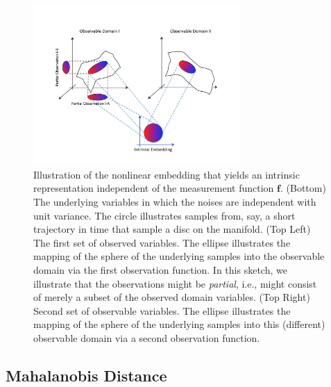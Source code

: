 \documentclass[aip,jcp,preprint]{revtex4-1}
\begin{document}
\begin{figure}[ht]
\includegraphics[width=0.7\textwidth]{IntrinsicEmbeddingIllustration2}
\caption{Illustration of the nonlinear embedding that yields an intrinsic representation independent of the measurement function $\mathbf{f}$. (Bottom) The underlying variables in which the noises are independent with unit variance. The circle illustrates samples from, say, a short trajectory in time that sample a disc on the manifold. (Top Left) The first set of observed variables. The ellipse illustrates the mapping of the sphere of the underlying samples into the observable domain via the first observation function. In this sketch, we illustrate that the observations might be {\em partial}, i.e., might consist of merely a subset of the observed domain variables. (Top Right) Second set of observable variables. The ellipse illustrates the mapping of the sphere of the underlying samples into this (different) observable domain via a second observation function.}
\label{fig:IntrinsicIllustration}
\end{figure}

\subsection{Mahalanobis Distance}
\label{subsec:mahalanobis}
\end{document}
